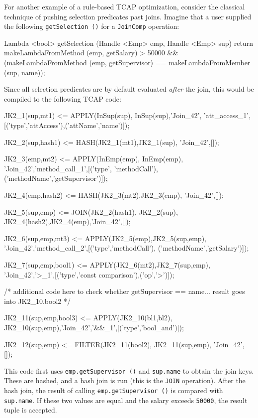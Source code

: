 \noindent
For another example of a rule-based TCAP optimization, 
consider the classical technique of pushing selection predicates past joins.  Imagine that a user supplied the following
\texttt{getSelection ()} for a \texttt{JoinComp} operation:

\begin{codesmall} 
Lambda <bool> getSelection (Handle <Emp> emp, 
    Handle <Emp> sup) {
    return makeLambdaFromMethod (emp, getSalary) > 50000 
    && (makeLambdaFromMethod (emp, getSupervisor) == 
           makeLambdaFromMember (sup, name));
}	
\end{codesmall}

\noindent
Since all selection predicates are by default evaluated \emph{after} the join, 
this would be compiled to the following TCAP code:

\begin{codesmall}
JK2_1(sup,mt1) <= APPLY(InSup(sup), InSup(sup),'Join_42',
'att_access_1',[('type','attAccess'),('attName','name')]);

JK2_2(sup,hash1) <= HASH(JK2_1(mt1),JK2_1(sup),
'Join_42',[]);

JK2_3(emp,mt2) <= APPLY(InEmp(emp), InEmp(emp),
'Join_42','method_call_1',[('type', 'methodCall'), 
('methodName','getSupervisor')]);

JK2_4(emp,hash2) <= HASH(JK2_3(mt2),JK2_3(emp),
'Join_42',[]);

JK2_5(sup,emp) <= JOIN(JK2_2(hash1), JK2_2(sup), 
JK2_4(hash2),JK2_4(emp),'Join_42',[]);

JK2_6(sup,emp,mt3) <= APPLY(JK2_5(emp),JK2_5(sup,emp),
'Join_42','method_call_2',[('type','methodCall'), 
('methodName','getSalary')]);

JK2_7(sup,emp,bool1) <= APPLY(JK2_6(mt2),JK2_7(sup,emp),
'Join_42','>_1',[('type','const comparison'),('op','>')]);

/* additional code here to check whether getSupervisor == 
name... result goes into JK2_10.bool2 */

JK2_11(sup,emp,bool3) <= APPLY(JK2_10(bl1,bl2), 
JK2_10(sup,emp),'Join_42','&&_1',[('type','bool_and')]);

JK2_12(sup,emp) <= FILTER(JK2_11(bool2),
JK2_11(sup,emp), 'Join_42', []);
\end{codesmall}
 
\noindent
This code first uses \texttt{emp.getSupervisor ()} and \texttt{sup.name} to obtain the join keys. These are hashed, and 
a hash join is run (this is the \texttt{JOIN} operation).  After the hash join,
the result of calling \texttt{emp.getSupervisor ()} is compared with
\texttt{sup.name}.  If these two values are equal and the salary exceeds \texttt{50000}, the result tuple is accepted.

